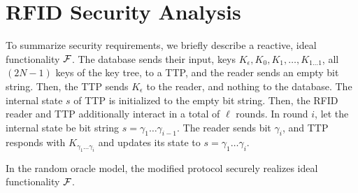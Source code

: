 \section{RFID Security Analysis}
\label{sec:rf-proof}
To summarize security requirements, we briefly describe a reactive,
ideal functionality ${\mathcal{F}}$.  The database sends their input, keys
$K_\epsilon,K_0,K_1,\ldots,K_{1\ldots{}1}$, all $(2N-1)$ keys of the
key tree, to a TTP, and the reader sends an empty bit string. Then,
the TTP sends $K_\epsilon$ to the reader, and nothing to the database.
The internal state $s$ of TTP is initialized to the empty bit string.
Then, the RFID reader and TTP additionally interact in a total of
$\ell$ rounds. In round $i$, let the internal state be bit string
$s=\gamma_1\ldots{}\gamma_{i-1}$. The reader sends bit $\gamma_i$, and
TTP responds with $K_{\gamma_1\ldots\gamma_{i}}$ and updates its
state to $s=\gamma_1\ldots\gamma_{i}$.

\begin{lemma}\label{rfidproof} In the random oracle model, the modified \citeauthor{molnar} protocol securely realizes 
ideal functionality ${\mathcal{F}}$.
\end{lemma}

